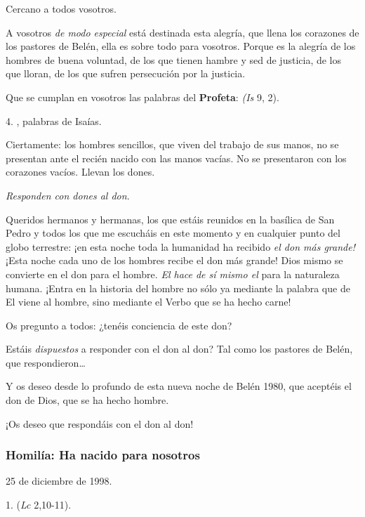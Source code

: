 \begin{body}
\begin{body}
Cercano a todos vosotros.

A vosotros \emph{de modo especial} está destinada esta alegría, que llena los corazones de los pastores de Belén, ella es sobre todo para vosotros. Porque es la alegría de los hombres de buena voluntad, de los que tienen hambre y sed de justicia, de los que lloran, de los que sufren persecución por la justicia.

Que se cumplan en vosotros las palabras del \textbf{Profeta}:  \emph{(Is} 9, 2).

4. , palabras de Isaías.

Ciertamente: los hombres sencillos, que viven del trabajo de sus manos, no se presentan ante el recién nacido con las manos vacías. No se presentaron con los corazones vacíos. Llevan los dones.

\emph{Responden con dones al don}.

Queridos hermanos y hermanas, los que estáis reunidos en la basílica de San Pedro y todos los que me escucháis en este momento y en cualquier punto del globo terrestre: ¡en esta noche toda la humanidad ha recibido \emph{el don más grande!} ¡Esta noche cada uno de los hombres recibe el don más grande! Dios mismo se convierte en el don para el hombre. \emph{El hace de sí mismo el } para la naturaleza humana. ¡Entra en la historia del hombre no sólo ya mediante la palabra que de El viene al hombre, sino mediante el Verbo que se ha hecho carne!

Os pregunto a todos: ¿tenéis conciencia de este don?

Estáis \emph{dispuestos} a responder con el don al don? Tal como los pastores de Belén, que respondieron\ldots{}

Y os deseo desde lo profundo de esta nueva noche de Belén 1980, que aceptéis el don de Dios, que se ha hecho hombre.

¡Os deseo que respondáis con el don al don!

\subsubsection{Homilía: Ha nacido para nosotros}

25 de diciembre de 1998.

1.  (\emph{Lc} 2,10-11).


\end{body}
\end{body}
